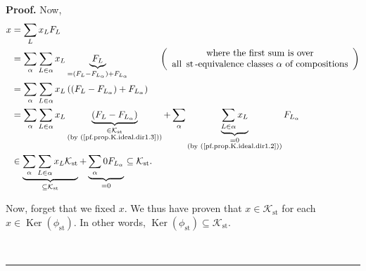 \documentclass[numbers=enddot,12pt,final,onecolumn,notitlepage]{scrartcl}%
\theoremstyle{definition}
\newenvironment{proof}[1][Proof]{\noindent\textbf{#1.} }{\ \rule{0.5em}{0.5em}}
\newenvironment{verlong}{}{}
\let\sumnonlimits\sum
\renewcommand{\sum}{\sumnonlimits\limits}
\begin{document}
\begin{verlong}
\begin{proof}
Now,%
\begin{align*}
x  &  =\sum_{L}x_{L}F_{L}\\
&  =\sum_{\alpha}\sum_{L\in\alpha}x_{L}\underbrace{F_{L}}_{=\left(
F_{L}-F_{L_{\alpha}}\right)  +F_{L_{\alpha}}}\ \ \ \ \ \ \ \ \ \ \left(
\begin{array}
[c]{c}%
\text{where the first sum is over}\\
\text{all }\operatorname{st}\text{-equivalence classes }\alpha\text{ of
compositions}%
\end{array}
\right) \\
&  =\sum_{\alpha}\sum_{L\in\alpha}x_{L}\left(  \left(  F_{L}-F_{L_{\alpha}%
}\right)  +F_{L_{\alpha}}\right) \\
&  =\sum_{\alpha}\sum_{L\in\alpha}x_{L}\underbrace{\left(  F_{L}-F_{L_{\alpha
}}\right)  }_{\substack{\in\mathcal{K}_{\operatorname{st}}\\\text{(by
(\ref{pf.prop.K.ideal.dir1.3}))}}}+\sum_{\alpha}\underbrace{\sum_{L\in\alpha
}x_{L}}_{\substack{=0\\\text{(by (\ref{pf.prop.K.ideal.dir1.2}))}%
}}F_{L_{\alpha}}\\
&  \in\underbrace{\sum_{\alpha}\sum_{L\in\alpha}x_{L}\mathcal{K}%
_{\operatorname{st}}}_{\subseteq\mathcal{K}_{\operatorname{st}}%
}+\underbrace{\sum_{\alpha}0F_{L_{\alpha}}}_{=0}\subseteq\mathcal{K}%
_{\operatorname{st}}.
\end{align*}


Now, forget that we fixed $x$. We thus have proven that $x\in\mathcal{K}%
_{\operatorname{st}}$ for each $x\in\operatorname*{Ker}\left(  \phi
_{\operatorname{st}}\right)  $. In other words, $\operatorname*{Ker}\left(
\phi_{\operatorname{st}}\right)  \subseteq\mathcal{K}_{\operatorname{st}}$.


\end{proof}
\end{verlong}
\end{document}
